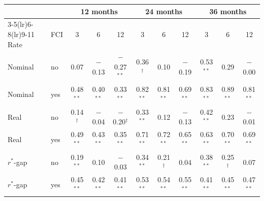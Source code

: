 \begin{tabular}{llccccccccc}
\toprule
 & & \multicolumn{3}{c}{12 months} & \multicolumn{3}{c}{24 months} & \multicolumn{3}{c}{36 months}\\
\cmidrule(lr){3-5}\cmidrule(lr){6-8}\cmidrule(lr){9-11}
Rate & FCI & 3 & 6 & 12 & 3 & 6 & 12 & 3 & 6 & 12 \\
\midrule
Nominal & no & 0.07 & $-$0.13 & $-$0.27$^{**}$ & 0.36$^{\dagger}$ & 0.10 & $-$0.19 & 0.53$^{**}$ & 0.29 & $-$0.00 \\
Nominal & yes & 0.48$^{**}$ & 0.40$^{**}$ & 0.33$^{**}$ & 0.82$^{**}$ & 0.81$^{**}$ & 0.69$^{**}$ & 0.83$^{**}$ & 0.89$^{**}$ & 0.81$^{**}$ \\
\midrule
Real & no & 0.14$^{\dagger}$ & $-$0.04 & $-$0.20$^{\dagger}$ & 0.33$^{**}$ & 0.12 & $-$0.13 & 0.42$^{**}$ & 0.23 & $-$0.01 \\
Real & yes & 0.49$^{**}$ & 0.43$^{**}$ & 0.35$^{**}$ & 0.71$^{**}$ & 0.72$^{**}$ & 0.65$^{**}$ & 0.63$^{**}$ & 0.70$^{**}$ & 0.69$^{**}$ \\
\midrule
$r^*$-gap & no & 0.19$^{**}$ & 0.10 & $-$0.03 & 0.34$^{**}$ & 0.21$^{\dagger}$ & 0.04 & 0.38$^{**}$ & 0.25$^{\dagger}$ & 0.07 \\
$r^*$-gap & yes & 0.45$^{**}$ & 0.42$^{**}$ & 0.41$^{**}$ & 0.53$^{**}$ & 0.54$^{**}$ & 0.55$^{**}$ & 0.41$^{**}$ & 0.45$^{**}$ & 0.47$^{**}$ \\
\bottomrule
\end{tabular}
